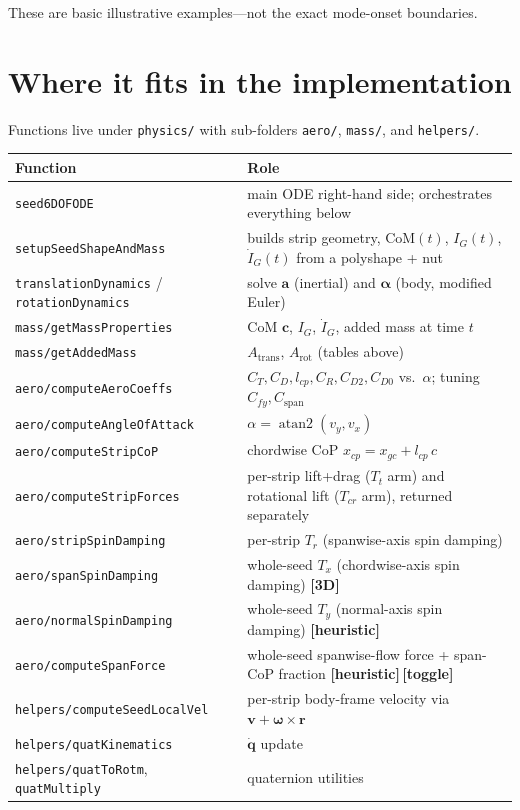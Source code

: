 \documentclass[11pt]{article}
\newcommand{\newin}{{\small\textbf{\color{blue}[3D]}}}          %
\newcommand{\heur}{{\small\textbf{\color{teal}[heuristic]}}}     %
\newcommand{\opt}{{\small\textbf{\color{orange!80!black}[toggle]}}} %
\begin{document}
\medskip
\noindent These are basic illustrative examples---not the exact mode-onset boundaries.

\section*{Where it fits in the implementation}
Functions live under \texttt{physics/} with sub-folders \texttt{aero/}, \texttt{mass/}, and
\texttt{helpers/}.

\begin{tabularx}{\textwidth}{@{} l L @{}}
\toprule
\textbf{Function} & \textbf{Role} \\
\midrule
\texttt{seed6DOFODE} & main ODE right-hand side; orchestrates everything below \\
\texttt{setupSeedShapeAndMass} & builds strip geometry, CoM$(t)$, $I_G(t)$, $\dot I_G(t)$ from a polyshape + nut \\
\texttt{translationDynamics} / \texttt{rotationDynamics} & solve $\mathbf a$ (inertial) and $\boldsymbol\alpha$ (body, modified Euler) \\
\addlinespace
\texttt{mass/getMassProperties} & CoM $\mathbf c$, $I_G$, $\dot I_G$, added mass at time $t$ \\
\texttt{mass/getAddedMass} & $A_{\text{trans}}$, $A_{\text{rot}}$ (tables above) \\
\addlinespace
\texttt{aero/computeAeroCoeffs} & $C_T,C_D,l_{cp},C_R,C_{D2},C_{D0}$ vs.\ $\alpha$; tuning $C_{fy},C_{\text{span}}$ \\
\texttt{aero/computeAngleOfAttack} & $\alpha=\operatorname{atan2}(v_y,v_x)$ \\
\texttt{aero/computeStripCoP} & chordwise CoP $x_{cp}=x_{gc}+l_{cp}\,c$ \\
\texttt{aero/computeStripForces} & per-strip lift+drag ($T_t$ arm) and rotational lift ($T_{cr}$ arm), returned separately \\
\texttt{aero/stripSpinDamping} & per-strip $T_r$ (spanwise-axis spin damping) \\
\texttt{aero/spanSpinDamping} & whole-seed $T_x$ (chordwise-axis spin damping) \newin{} \\
\texttt{aero/normalSpinDamping} & whole-seed $T_y$ (normal-axis spin damping) \heur{} \\
\texttt{aero/computeSpanForce} & whole-seed spanwise-flow force + span-CoP fraction \heur{}\,\opt{} \\
\addlinespace
\texttt{helpers/computeSeedLocalVel} & per-strip body-frame velocity via $\mathbf v+\boldsymbol\omega\times\mathbf r$ \\
\texttt{helpers/quatKinematics} & $\dot{\mathbf q}$ update \\
\texttt{helpers/quatToRotm}, \texttt{quatMultiply} & quaternion utilities \\
\bottomrule
\end{tabularx}
\end{document}
